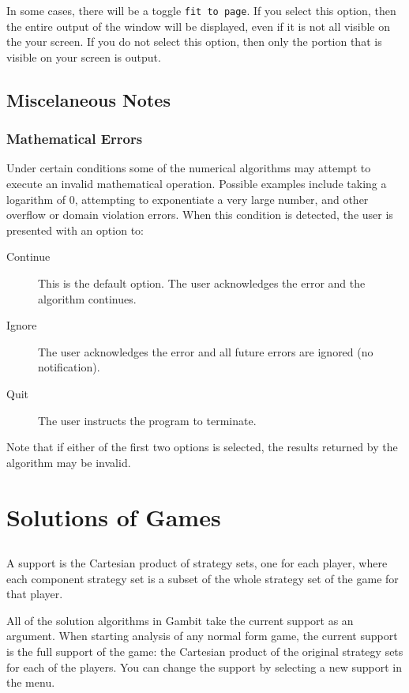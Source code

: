 In some cases, there will be a toggle \verb+fit to page+.  If you select 
this option, then the entire output of the window 
will be displayed, even if it is not all 
visible on the your screen.  If you do not select this option, then only 
the portion that is visible on your screen is output.  

\section{Miscelaneous Notes}
\subsection{Mathematical Errors}
Under certain conditions some of the numerical algorithms may attempt to
execute an invalid mathematical operation.  Possible examples include
taking a logarithm of 0, attempting to exponentiate a very large number, and
other overflow or domain violation errors.  When this condition is detected,
the user is presented with an option to:
\begin{description}
\item[Continue] This is the default option.  The user acknowledges the error
and the algorithm continues.
\item[Ignore] The user acknowledges the error and all future errors are
ignored (no notification).
\item[Quit] The user instructs the program to terminate.
\end{description}

Note that if either of the first two options is selected, the results 
returned by the algorithm may be invalid.

\chapter{Solutions of Games}

\section{}\label{supportsec}

A support is the Cartesian product of strategy sets, one for each player, 
where  each component strategy set is a subset of the whole strategy 
set of the game for that player.  

All of the solution algorithms in Gambit take the current support as an 
argument.  When starting analysis of any normal form game,  the current 
support is the full support of the game:  the Cartesian product of the original 
strategy sets for each of the players.  You can change the support by 
selecting a new support in the  menu.  

